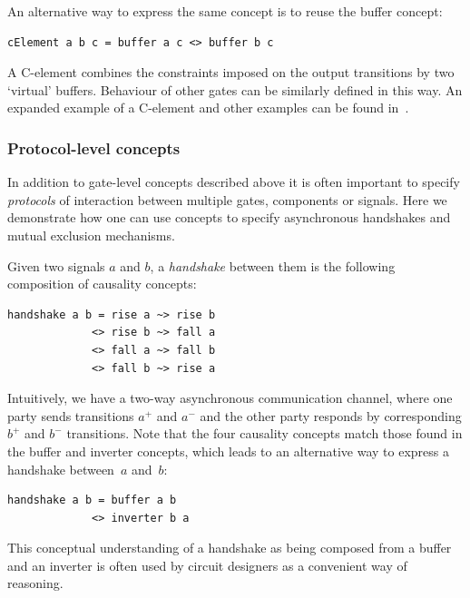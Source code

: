 \documentclass[british,conference,compsoc]{IEEEtran}
\begin{document}
An alternative way to express the same concept is to reuse the buffer concept:

\begin{verbatim}
cElement a b c = buffer a c <> buffer b c
\end{verbatim}

A C-element combines the constraints imposed on the output
transitions by two `virtual' buffers. Behaviour of other gates can be similarly
defined in this way. An expanded example of a C-element and other examples can 
be found in~\cite{2015_Beaumont_MEMOCODE}.

\vspace{-2mm}

\subsubsection{Protocol-level concepts} In addition to gate-level concepts
described above it is often important to specify \emph{protocols}
of interaction between multiple gates, components or signals. Here we 
demonstrate how one can use concepts to specify asynchronous handshakes
and mutual exclusion mechanisms.

Given two signals $a$ and $b$, a \emph{handshake} between them is
the following composition of causality concepts:

\begin{verbatim}
handshake a b = rise a ~> rise b 
             <> rise b ~> fall a 
             <> fall a ~> fall b 
             <> fall b ~> rise a
\end{verbatim}

Intuitively, we have a two-way asynchronous communication channel,
where one party sends transitions $a^{+}$ and $a^{-}$ and the other
party responds by corresponding $b^{+}$ and $b^{-}$ transitions.
Note that the four causality concepts match those found
in the buffer and inverter concepts, which leads to an alternative
way to express a handshake between~$a$ and~$b$:

\begin{verbatim}
handshake a b = buffer a b 
             <> inverter b a
\end{verbatim}

This conceptual understanding of a handshake as being composed
from a buffer and an inverter is often used by circuit designers as
a convenient way of reasoning.

\vspace{-2mm}
\end{document}
